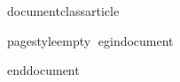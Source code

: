 
documentclass{article}
\usepackage[margin=1pt]{geometry}
\usepackage{tikz}
pagestyle{empty}
egin{document}
end{document}
